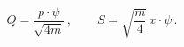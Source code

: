 \begin{equation}\label{boro3.6}
Q=\frac{p\cdot\psi}{\sqrt{4m}}\,,\qquad S=\sqrt{\frac{m}{4}}\,x\cdot\psi\,.
\end{equation}

